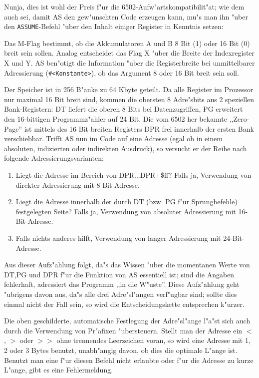 \documentclass[12pt,a4paper,twoside]{report}
\newcommand{\tty}[1]{{\tt #1}}
\begin{document}
Nunja, dies ist wohl der Preis f"ur die 6502-Aufw"artskompatibilit"at;
wie dem auch sei, damit AS den gew"unschten Code erzeugen kann, mu"s
man ihn "uber den \tty{ASSUME}-Befehl "uber den Inhalt einiger
Register in Kenntnis setzen:
\par
Das M-Flag bestimmt, ob die Akkumulatoren A und B 8 Bit (1) oder 16 Bit
(0) breit sein sollen.  Analog entscheidet das Flag X "uber die Breite
der Indexregister X und Y.  AS ben"otigt die Information "uber die
Registerbreite bei unmittelbarer Adressierung (\tty{\#<Konstante>}), ob das
Argument 8 oder 16 Bit breit sein soll.
\par
Der Speicher ist in 256 B"anke zu 64 Kbyte geteilt.  Da alle Register
im Prozessor nur maximal 16 Bit breit sind, kommen die obersten 8
Adre"sbits aus 2 speziellen Bank-Registern: DT liefert die oberen 8
Bits bei Datenzugriffen, PG erweitert den 16-bittigen Programmz"ahler
auf 24 Bit.  Die vom 6502 her bekannte ,,Zero-Page'' ist mittels
des 16 Bit breiten Registers DPR frei innerhalb der ersten Bank
verschiebbar.  Trifft AS nun im Code auf eine Adresse (egal ob in
einem absoluten, indizierten oder indirekten Ausdruck), so versucht
er der Reihe nach folgende Adressierungsvarianten:
\begin{enumerate}
\item{Liegt die Adresse im Bereich von DPR...DPR+\$ff?  Falls ja,
      Verwendung von direkter Adressierung mit 8-Bit-Adresse.}
\item{Liegt die Adresse innerhalb der durch DT (bzw. PG f"ur
      Sprungbefehle) festgelegten Seite?  Falls ja, Verwendung von
      absoluter Adressierung mit 16-Bit-Adresse.}
\item{Falls nichts anderes hilft, Verwendung von langer Adressierung
      mit 24-Bit-Adresse.}
\end{enumerate}
Aus dieser Aufz"ahlung folgt, da"s das Wissen "uber die momentanen
Werte von DT,PG und DPR f"ur die Funktion von AS essentiell ist;
sind die Angaben fehlerhaft, adressiert das Programm ,,in die W"uste''.
Diese Aufz"ahlung geht "ubrigens davon aus, da"s alle drei
Adre"sl"angen verf"ugbar sind; sollte dies einmal nicht der Fall sein,
so wird die Entscheidungskette entsprechen k"urzer.

Die oben geschilderte, automatische Festlegung der Adre"sl"ange l"a"st
sich auch durch die Verwendung von Pr"afixen "ubersteuern.  Stellt
man der Adresse ein $<$, $>$ oder $>>$ ohne trennendes Leerzeichen voran,
so wird eine Adresse mit 1, 2 oder 3 Bytes benutzt, unabh"angig davon,
ob dies die optimale L"ange ist.  Benutzt man eine f"ur diesen Befehl
nicht erlaubte oder f"ur die Adresse zu kurze L"ange, gibt es eine
Fehlermeldung.
\end{document}
